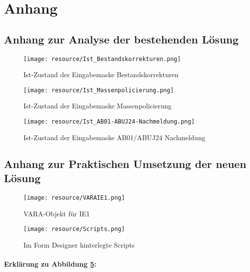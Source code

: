 \section{Anhang}

	\subsection{Anhang zur Analyse der bestehenden Lösung}
	\label{sec:AnhangZurIstAufnahme}
	
		\begin{figure}[H]
			\centering
			\texttt{[image: resource/Ist\_Bestandskorrekturen.png]}
			\caption{Ist-Zustand der Eingabemaske Bestandskorrekturen}
			\label{fig:Ist_Bestandskorrekturen}		
		\end{figure}
	
		\begin{figure}[H]
			\centering
			\texttt{[image: resource/Ist\_Massenpolicierung.png]}
			\caption{Ist-Zustand der Eingabemaske Massenpolicierung}
			\label{fig:Ist_Massenpolicierung}		
		\end{figure}
	
		\begin{figure}[H]
			\centering
			\texttt{[image: resource/Ist\_AB01-ABUJ24-Nachmeldung.png]}
			\caption{Ist-Zustand der Eingabemaske AB01/ABUJ24 Nachmeldung}
			\label{fig:Ist_AB01-ABUJ24-Nachmeldung}		
		\end{figure}			
	
	\newpage
	\subsection{Anhang zur Praktischen Umsetzung der neuen Lösung}
	
		\begin{figure}[H]
			\centering
			\texttt{[image: resource/VARAIE1.png]}
			\caption{VARA-Objekt für IE1}
			\label{fig:VARAIE1}		
		\end{figure}
		
		\begin{figure}[H]
			\centering
			\texttt{[image: resource/Scripts.png]}
			\caption{Im Form Designer hinterlegte Scripts}
			\label{fig:Scripts}		
		\end{figure}
	
		\paragraph{Erklärung zu Abbildung \ref{fig:Scripts}: }
		
